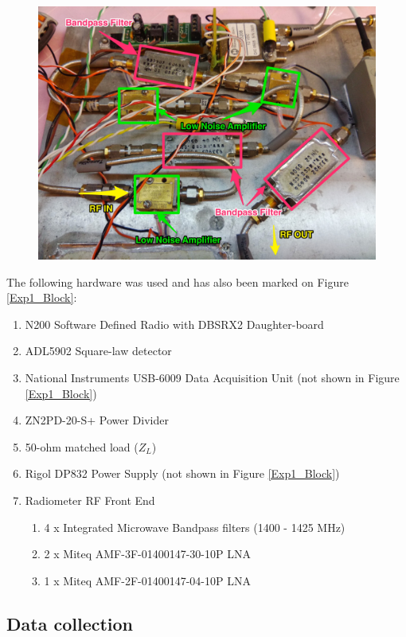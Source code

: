 {\begin{figure}[h!tb] \centering
\includegraphics[width=\textwidth]{Images/ISU_RF_noted.jpg}
\label{ISURF}
\end{figure}
}

The following hardware was used and has also been marked on Figure \ref{Exp1_Block}:

\begin{enumerate}
\item N200 Software Defined Radio with DBSRX2 Daughter-board
\item ADL5902 Square-law detector
\item National Instruments USB-6009 Data Acquisition Unit (not shown in Figure \ref{Exp1_Block})
\item ZN2PD-20-S+ Power Divider
\item 50-ohm matched load ($Z_L$)
\item Rigol DP832 Power Supply (not shown in Figure \ref{Exp1_Block})
\item Radiometer RF Front End
\begin{enumerate}
\item 4 x Integrated Microwave Bandpass filters (1400 - 1425 MHz)
\item 2 x Miteq AMF-3F-01400147-30-10P LNA
\item 1 x Miteq AMF-2F-01400147-04-10P LNA
\end{enumerate}
\end{enumerate}

\subsection{Data collection}\label{exp1_data}

